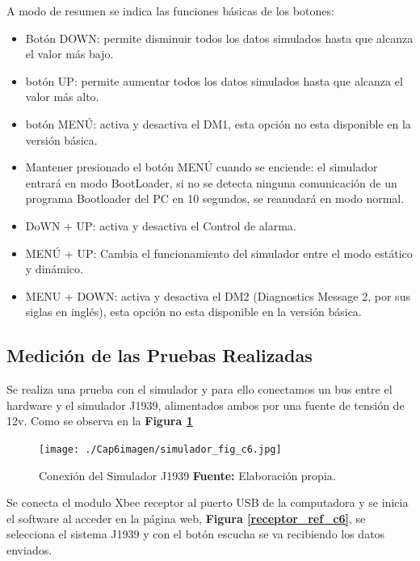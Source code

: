 A modo de resumen se indica las funciones básicas de los botones:
\begin{itemize}
\item Botón DOWN: permite disminuir todos los datos simulados hasta que alcanza el valor más bajo.
 \item botón UP: permite aumentar todos los datos simulados hasta que alcanza el valor más alto.
\item botón MENÚ: activa y desactiva el DM1, esta opción no esta disponible en la versión básica.
\item Mantener presionado el botón MENÚ cuando se enciende: el simulador entrará en modo BootLoader, si no se detecta ninguna comunicación de un programa Bootloader del PC en 10 segundos, se reanudará en modo normal.
 \item DoWN + UP: activa y desactiva el Control de alarma.
\item MENÚ + UP: Cambia el funcionamiento del simulador entre el modo estático y dinámico.
\item MENU + DOWN: activa y desactiva el DM2 (Diagnostics Message 2, por sus siglas en inglés), esta opción no esta disponible en la versión básica.
\end{itemize}


	
\subsection{Medición de las Pruebas Realizadas}
Se realiza una prueba con el simulador y para ello conectamos un bus entre el hardware y el simulador J1939, alimentados ambos por una fuente de tensión de 12v. Como se observa en la \textbf{Figura \ref{simulador_ref_c6}}

\begin{figure}[H]
	\centering
	\texttt{[image: ./Cap6imagen/simulador\_fig\_c6.jpg]}
	\caption [Conexión del Simulador J1939.]{Conexión del Simulador J1939 \textbf{ Fuente:} %
		Elaboración propia.}
	\label{simulador_ref_c6} %
\end{figure}

Se conecta el modulo Xbee receptor al puerto USB de la computadora y se inicia el software al acceder en la página web, \textbf{Figura \ref{receptor_ref_c6}},  se selecciona el sistema J1939 y con el botón escucha se va recibiendo los datos enviados. 


